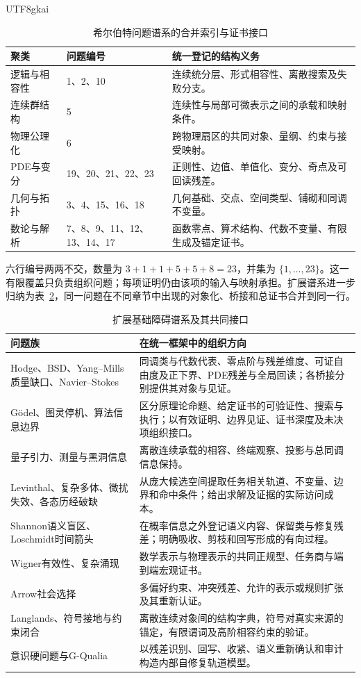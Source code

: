 \documentclass[11pt,a4paper]{article}
\theoremstyle{plain}
\theoremstyle{definition}
\theoremstyle{remark}
\begin{document}
\begin{CJK*}{UTF8}{gkai}
\begin{table}[htbp]
\centering\small
\caption{希尔伯特问题谱系的合并索引与证书接口}
\label{pc:hilbert-table}
\begin{tabular}{p{}p{}p{}}
\hline
聚类 & 问题编号 & 统一登记的结构义务\\\hline
逻辑与相容性 & 1、2、10 & 连续统分层、形式相容性、离散搜索及失败分支。\\
连续群结构 & 5 & 连续性与局部可微表示之间的承载和映射条件。\\
物理公理化 & 6 & 跨物理扇区的共同对象、量纲、约束与接受映射。\\
PDE与变分 & 19、20、21、22、23 & 正则性、边值、单值化、变分、奇点及可回读残差。\\
几何与拓扑 & 3、4、15、16、18 & 几何基础、交点、空间类型、铺砌和同调不变量。\\
数论与解析 & 7、8、9、11、12、13、14、17 & 函数零点、算术结构、代数不变量、有限生成及锚定证书。\\\hline
\end{tabular}
\end{table}

六行编号两两不交，数量为 $3+1+1+5+5+8=23$，并集为 $\{1,\ldots,23\}$。这一有限覆盖只负责组织问题；每项证明仍由该项的输入与映射承担。扩展谱系进一步归纳为表~\ref{pc:extended-table}，同一问题在不同章节中出现的对象化、桥接和总证书合并到同一行。

\begin{table}[htbp]
\centering\small
\caption{扩展基础障碍谱系及其共同接口}
\label{pc:extended-table}
\begin{tabular}{p{}p{}}
\hline
问题族 & 在统一框架中的组织方向\\\hline
Hodge、BSD、Yang--Mills质量缺口、Navier--Stokes & 同调类与代数代表、零点阶与残差维度、可证自由度及正下界、PDE残差与全局回读；各桥接分别提供其对象与见证。\\
Gödel、图灵停机、算法信息边界 & 区分原理论命题、给定证书的可验证性、搜索与执行；以有效证明、边界见证、证书深度及未决项组织接口。\\
量子引力、测量与黑洞信息 & 离散连续承载的相容、终端观察、投影与总同调信息保持。\\
Levinthal、复杂多体、微扰失效、各态历经破缺 & 从庞大候选空间提取任务相关轨道、不变量、边界和命中条件；给出求解及证据的实际访问成本。\\
Shannon语义盲区、Loschmidt时间箭头 & 在概率信息之外登记语义内容、保留类与修复残差；明确吸收、剪枝和回写形成的有向过程。\\
Wigner有效性、复杂涌现 & 数学表示与物理表示的共同正规型、任务商与端到端宏观证书。\\
Arrow社会选择 & 多偏好约束、冲突残差、允许的表示或规则扩张及其重新认证。\\
Langlands、符号接地与约束闭合 & 离散连续对象间的结构字典，符号对真实来源的锚定，有限谓词及高阶相容约束的验证。\\
意识硬问题与G-Qualia & 以残差识别、回写、收紧、语义重新确认和审计构造内部自修复轨道模型。\\\hline
\end{tabular}
\end{table}


\end{CJK*}
\end{document}
